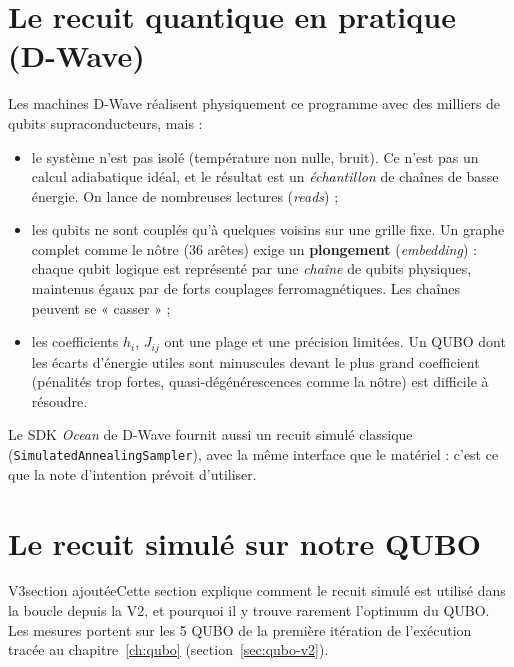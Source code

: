 \section{Le recuit quantique en pratique (D-Wave)}
Les machines D-Wave réalisent physiquement ce programme avec des milliers de qubits supraconducteurs, mais :
\begin{itemize}
\item le système n'est pas isolé (température non nulle, bruit). Ce n'est pas un calcul adiabatique idéal, et le résultat est un \emph{échantillon} de chaînes de basse énergie. On lance de nombreuses lectures (\emph{reads}) ;
\item les qubits ne sont couplés qu'à quelques voisins sur une grille fixe. Un graphe complet comme le nôtre (36 arêtes) exige un \textbf{plongement} (\emph{embedding}) : chaque qubit logique est représenté par une \emph{chaîne} de qubits physiques, maintenus égaux par de forts couplages ferromagnétiques. Les chaînes peuvent se « casser » ;
\item les coefficients $h_i$, $J_{ij}$ ont une plage et une précision limitées. Un QUBO dont les écarts d'énergie utiles sont minuscules devant le plus grand coefficient (pénalités trop fortes, quasi-dégénérescences comme la nôtre) est difficile à résoudre.
\end{itemize}
Le SDK \emph{Ocean} de D-Wave fournit aussi un recuit simulé classique (\texttt{SimulatedAnnealingSampler}), avec la même interface que le matériel : c'est ce que la note d'intention prévoit d'utiliser.

\section{Le recuit simulé sur notre QUBO}\label{sec:recuit-v2}
\begin{evolution}{V3}{section ajoutée}Cette section explique comment le recuit simulé est utilisé dans la boucle depuis la V2, et pourquoi il y trouve rarement l'optimum du QUBO. Les mesures portent sur les 5 QUBO de la première itération de l'exécution tracée au chapitre~\ref{ch:qubo} (section~\ref{sec:qubo-v2}).\end{evolution}


